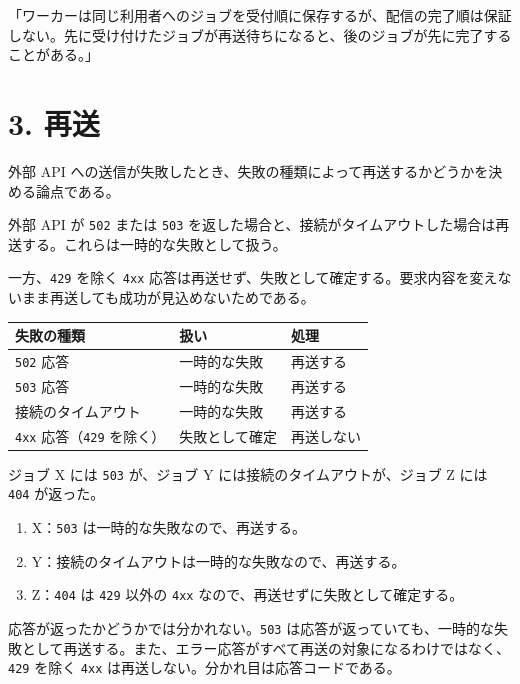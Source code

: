\documentclass[10pt]{article}
\begin{document}
\begin{genbun}
「ワーカーは同じ利用者へのジョブを受付順に保存するが、配信の完了順は保証しない。先に受け付けたジョブが再送待ちになると、後のジョブが先に完了することがある。」
\end{genbun}

\section{3. 再送}
外部 API への送信が失敗したとき、失敗の種類によって再送するかどうかを決める論点である。

\begin{youten}
外部 API が \texttt{502} または \texttt{503} を返した場合と、接続がタイムアウトした場合は再送する。これらは一時的な失敗として扱う。

一方、\texttt{429} を除く \texttt{4xx} 応答は再送せず、失敗として確定する。要求内容を変えないまま再送しても成功が見込めないためである。
\end{youten}

\begin{tabular}{L{0.34}ll}
\toprule
失敗の種類 & 扱い & 処理 \\
\midrule
\texttt{502} 応答 & 一時的な失敗 & 再送する \\
\texttt{503} 応答 & 一時的な失敗 & 再送する \\
接続のタイムアウト & 一時的な失敗 & 再送する \\
\texttt{4xx} 応答（\texttt{429} を除く） & 失敗として確定 & 再送しない \\
\bottomrule
\end{tabular}

\begin{reidai}
ジョブ X には \texttt{503} が、ジョブ Y には接続のタイムアウトが、ジョブ Z には \texttt{404} が返った。
\begin{enumerate}
  \item X：\texttt{503} は一時的な失敗なので、再送する。
  \item Y：接続のタイムアウトは一時的な失敗なので、再送する。
  \item Z：\texttt{404} は \texttt{429} 以外の \texttt{4xx} なので、再送せずに失敗として確定する。
\end{enumerate}
\end{reidai}

\begin{mayoi}
応答が返ったかどうかでは分かれない。\texttt{503} は応答が返っていても、一時的な失敗として再送する。また、エラー応答がすべて再送の対象になるわけではなく、\texttt{429} を除く \texttt{4xx} は再送しない。分かれ目は応答コードである。
\end{mayoi}
\end{document}
